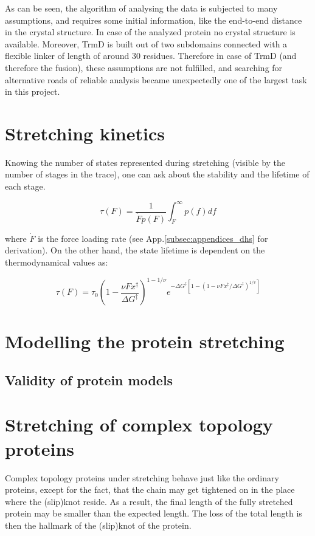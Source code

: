 As can be seen, the algorithm of analysing the data is subjected to many assumptions, and requires some initial information, like the end-to-end distance in the crystal structure.
In case of the analyzed protein no crystal structure is available.
Moreover, TrmD is built out of two subdomains connected with a flexible linker of length of around 30 residues.
Therefore in case of TrmD (and therefore the fusion), these assumptions are not fulfilled, and searching for alternative roads of reliable analysis became unexpectedly one of the largest task in this project.

\section{Stretching kinetics}
\label{sec:theory-kinetics}
Knowing the number of states represented during stretching (visible by the number of stages in the trace), one can ask about the stability and the lifetime of each stage.

\begin{equation}
    \boxed{\tau(F) = \frac{1}{\dot{F}p(F)}\int_F^\infty p(f)df}
    \label{eq:theory-kinetics-lifetime}
\end{equation}

where $\dot{F}$ is the force loading rate (see App.\ref{subsec:appendices_dhs} for derivation).
On the other hand, the state lifetime is dependent on the thermodynamical values as:

\begin{equation}
    \boxed{\tau(F) = \tau_0 \left(1-\frac{\nu Fx^\ddagger}{\Delta G^\ddagger}\right)^{1-1/\nu} e^{-\Delta G^\ddagger [1-(1-\nu Fx^\ddagger/\Delta G^\ddagger)^{1/v}]}}
    \label{eq:theory-kinetics-dhs-lifetime}
\end{equation}

\section{Modelling the protein stretching}
\label{sec:theory-modelling}

\subsection{Validity of protein models}
\label{subsec:theory-modelling-validity}

\section{Stretching of complex topology proteins}
\label{sec:theory-knotted}
Complex topology proteins under stretching behave just like the ordinary proteins, except for the fact, that the chain may get tightened on in the place where the (slip)knot reside.
As a result, the final length of the fully stretched protein may be smaller than the expected length.
The loss of the total length is then the hallmark of the (slip)knot of the protein.

